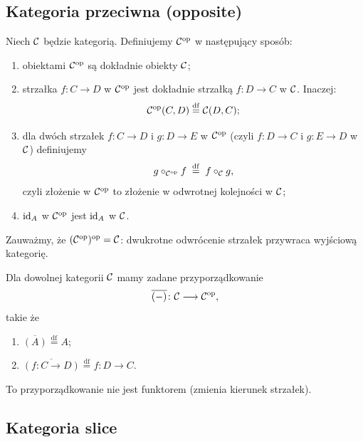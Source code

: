 \subsection{Kategoria przeciwna (opposite)}

\begin{definicja}
Niech $\mathcal{C}$ będzie kategorią. Definiujemy $\mathcal{C}^{\mathrm{op}}$ w następujący sposób:
\begin{enumerate}
    \item[(a)] obiektami $\mathcal{C}^{\mathrm{op}}$ są dokładnie obiekty $\mathcal{C}$;
    \item[(b)] strzałka $f \colon C \to D$ w $\mathcal{C}^{\mathrm{op}}$ jest dokładnie strzałką $f \colon D \to C$ w $\mathcal{C}$. Inaczej:
    \[
        \mathcal{C}^{\mathrm{op}}(C, D) \stackrel{\mathrm{df}}{=} \mathcal{C}(D, C);
    \]
    \item[(c)] dla dwóch strzałek $f \colon C \to D$ i $g \colon D \to E$ w $\mathcal{C}^{\mathrm{op}}$ (czyli $f \colon D \to C$ i $g \colon E \to D$ w $\mathcal{C}$) definiujemy
    \[
        g \circ_{\mathcal{C}^{\mathrm{op}}} f \;\stackrel{\mathrm{df}}{=}\; f \circ_{\mathcal{C}} g,
    \]
    czyli złożenie w $\mathcal{C}^{\mathrm{op}}$ to złożenie w odwrotnej kolejności w $\mathcal{C}$;
    \item[] $\mathrm{id}_A$ w $\mathcal{C}^{\mathrm{op}}$ jest $\mathrm{id}_A$ w $\mathcal{C}$.
\end{enumerate}
\end{definicja}

\begin{uwaga}
Zauważmy, że $(\mathcal{C}^{\mathrm{op}})^{\mathrm{op}} = \mathcal{C}$: dwukrotne odwrócenie strzałek przywraca wyjściową kategorię.
\end{uwaga}

\begin{uwaga}
Dla dowolnej kategorii $\mathcal{C}$ mamy zadane przyporządkowanie
\[
    \overline{(-)} \colon \mathcal{C} \longrightarrow \mathcal{C}^{\mathrm{op}},
\]
takie że
\begin{enumerate}
    \item[(a)] $\overline{(A)} \stackrel{\mathrm{df}}{=} A$;
    \item[(b)] $\overline{(f \colon C \to D)} \stackrel{\mathrm{df}}{=} f \colon D \to C$.
\end{enumerate}
To przyporządkowanie nie jest funktorem (zmienia kierunek strzałek).
\end{uwaga}

\subsection{Kategoria slice}

